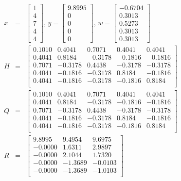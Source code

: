 \begin{eqnarray}
  x &=&
  \begin{bmatrix}
    1 \\
    4 \\
    7 \\
    4 \\
    4
  \end{bmatrix}
  \text{, }
  y = 
  \begin{bmatrix}
    9.8995 \\
    0 \\
    0 \\
    0 \\
    0
  \end{bmatrix}
  \text{, }
  w = 
  \begin{bmatrix}
    -0.6704 \\
    0.3013 \\
    0.5273 \\
    0.3013 \\
    0.3013
  \end{bmatrix}
  \\
  H &=& 
  \begin{bmatrix}
    0.1010 &   0.4041 &   0.7071 &   0.4041 &   0.4041 \\
    0.4041 &   0.8184 &  -0.3178 &  -0.1816 &  -0.1816 \\
    0.7071 &  -0.3178 &   0.4438 &  -0.3178 &  -0.3178 \\
    0.4041 &  -0.1816 &  -0.3178 &   0.8184 &  -0.1816 \\
    0.4041 &  -0.1816 &  -0.3178 &  -0.1816 &   0.8184 \\
  \end{bmatrix}
  \\
  Q &=&
  \begin{bmatrix}
    0.1010 &   0.4041 &   0.7071 &   0.4041 &   0.4041 \\
    0.4041 &   0.8184 &  -0.3178 &  -0.1816 &  -0.1816 \\
    0.7071 &  -0.3178 &   0.4438 &  -0.3178 &  -0.3178 \\
    0.4041 &  -0.1816 &  -0.3178 &   0.8184 &  -0.1816 \\
    0.4041 &  -0.1816 &  -0.3178 &  -0.1816 &   0.8184 \\
  \end{bmatrix}
  \\
  R &=& 
  \begin{bmatrix}
    9.8995 &   9.4954 &   9.6975 \\
   -0.0000 &   1.6311 &   2.9897 \\
   -0.0000 &   2.1044 &   1.7320 \\
   -0.0000 &  -1.3689 &  -0.0103 \\
   -0.0000 &  -1.3689 &  -1.0103 \\
  \end{bmatrix}
\end{eqnarray}

